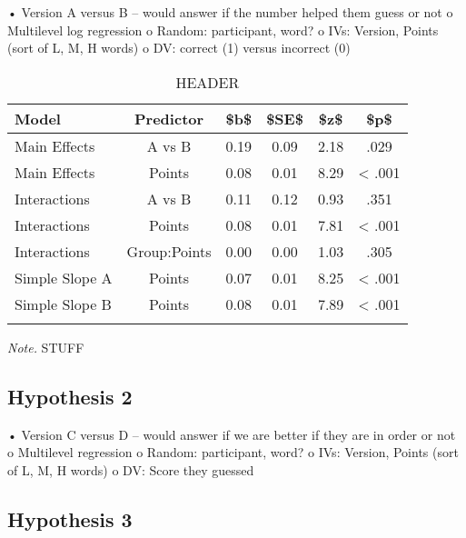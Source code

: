 \documentclass[man]{apa6}
\begin{document}
• Version A versus B -- would answer if the number helped them guess or not
o Multilevel log regression
o Random: participant, word?
o IVs: Version, Points (sort of L, M, H words)
o DV: correct (1) versus incorrect (0)

\begin{table}[tbp]
\begin{center}
\begin{threeparttable}
\caption{\label{tab:ab_table}HEADER}
\begin{tabular}{lccccc}
\toprule
Model & \multicolumn{1}{c}{Predictor} & \multicolumn{1}{c}{\$b\$} & \multicolumn{1}{c}{\$SE\$} & \multicolumn{1}{c}{\$z\$} & \multicolumn{1}{c}{\$p\$}\\
\midrule
Main Effects & A vs B & 0.19 & 0.09 & 2.18 & .029\\
Main Effects & Points & 0.08 & 0.01 & 8.29 & < .001\\
Interactions & A vs B & 0.11 & 0.12 & 0.93 & .351\\
Interactions & Points & 0.08 & 0.01 & 7.81 & < .001\\
Interactions & Group:Points & 0.00 & 0.00 & 1.03 & .305\\
Simple Slope A & Points & 0.07 & 0.01 & 8.25 & < .001\\
Simple Slope B & Points & 0.08 & 0.01 & 7.89 & < .001\\
\bottomrule
\addlinespace
\end{tabular}
\begin{tablenotes}[para]
\normalsize{\textit{Note.} STUFF}
\end{tablenotes}
\end{threeparttable}
\end{center}
\end{table}

\hypertarget{hypothesis-2}{%
\subsection{Hypothesis 2}\label{hypothesis-2}}

• Version C versus D -- would answer if we are better if they are in order or not
o Multilevel regression
o Random: participant, word?
o IVs: Version, Points (sort of L, M, H words)
o DV: Score they guessed

\hypertarget{hypothesis-3}{%
\subsection{Hypothesis 3}\label{hypothesis-3}}
\end{document}
